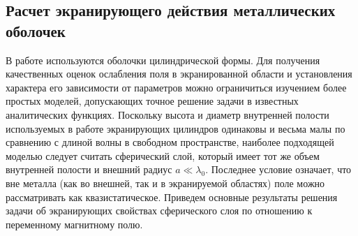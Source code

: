 





\subsection{Расчет экранирующего действия металлических оболочек}

В работе используются оболочки цилиндрической формы. Для получения качественных оценок ослабления поля в экранированной области и установления характера его зависимости от параметров можно ограничиться изучением более простых моделей, допускающих точное решение задачи в известных аналитических функциях. Поскольку высота и диаметр внутренней полости используемых в работе экранирующих цилиндров одинаковы и весьма малы по сравнению с длиной волны  в свободном пространстве, наиболее подходящей моделью следует считать сферический слой, который имеет тот же объем внутренней полости и внешний радиус $a \ll \lambda_0$. Последнее условие означает, что вне металла (как во внешней, так и в экранируемой областях) поле можно рассматривать как квазистатическое. Приведем основные результаты решения задачи об экранирующих свойствах сферического слоя по отношению к переменному магнитному полю. 


